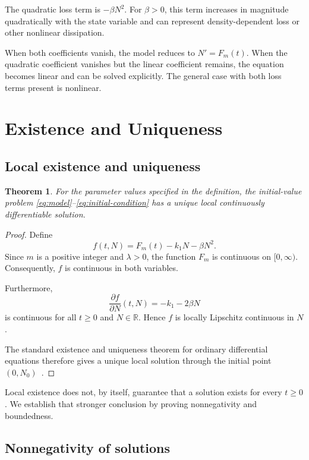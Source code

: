 \documentclass[12pt]{article}
\newtheorem{theorem}{Theorem}[section]
\theoremstyle{definition}
\theoremstyle{remark}
\begin{document}
The quadratic loss term is \(-\beta N^2\). For
\(\beta>0\), this term increases in magnitude quadratically
with the state variable and can represent density-dependent
loss or other nonlinear dissipation.

When both coefficients vanish, the model reduces to
\(N'=F_m(t)\). When the quadratic coefficient vanishes
but the linear coefficient remains, the equation becomes
linear and can be solved explicitly. The general case
with both loss terms present is nonlinear.

\section{Existence and Uniqueness}

\subsection{Local existence and uniqueness}

\begin{theorem}
For the parameter values specified in the definition,
the initial-value problem
\eqref{eq:model}--\eqref{eq:initial-condition}
has a unique local continuously differentiable solution.
\end{theorem}

\begin{proof}
Define
\[
f(t,N)=F_m(t)-k_1N-\beta N^2.
\]
Since \(m\) is a positive integer and \(\lambda>0\),
the function \(F_m\) is continuous on \([0,\infty)\).
Consequently, \(f\) is continuous in both variables.

Furthermore,
\[
\frac{\partial f}{\partial N}(t,N)
=-k_1-2\beta N
\]
is continuous for all \(t\geq 0\) and \(N\in\mathbb R\).
Hence \(f\) is locally Lipschitz continuous in \(N\).

The standard existence and uniqueness theorem for
ordinary differential equations therefore gives a unique
local solution through the initial point
\((0,N_0)\)~\cite{coddington,teschl}.
\end{proof}

Local existence does not, by itself, guarantee that a
solution exists for every \(t\geq 0\). We establish that
stronger conclusion by proving nonnegativity and
boundedness.

\subsection{Nonnegativity of solutions}
\end{document}
